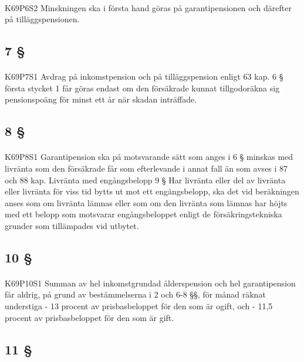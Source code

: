 \documentclass[a4paper,notitlepage,openany,10pt]{book}
\begin{document}
\paragraph*{}
{\tiny K69P6S2}
Minskningen ska i första hand göras på garantipensionen och därefter på tilläggspensionen.
\subsection*{7 §}
\paragraph*{}
{\tiny K69P7S1}
Avdrag på inkomstpension och på tilläggspension enligt 63 kap. 6 § första stycket 1 får göras endast om den försäkrade kunnat tillgodoräkna sig pensionspoäng för minst ett år när skadan inträffade.
\subsection*{8 §}
\paragraph*{}
{\tiny K69P8S1}
Garantipension ska på motsvarande sätt som anges i 6 § minskas med livränta som den försäkrade får som efterlevande i annat fall än som avses i 87 och 88 kap.
Livränta med engångsbelopp 9 § Har livränta eller del av livränta eller livränta för viss tid bytts ut mot ett engångsbelopp, ska det vid beräkningen anses som om livränta lämnas eller som om den livränta som lämnas har höjts med ett belopp som motsvarar engångsbeloppet enligt de försäkringstekniska grunder som tillämpades vid utbytet.
\subsection*{10 §}
\paragraph*{}
{\tiny K69P10S1}
Summan av hel inkomstgrundad ålderspension och hel garantipension får aldrig, på grund av bestämmelserna i 2 och 6-8 §§, för månad räknat understiga
\newline - 13 procent av prisbasbeloppet för den som är ogift, och
\newline - 11,5 procent av prisbasbeloppet för den som är gift.
\subsection*{11 §}
\end{document}
